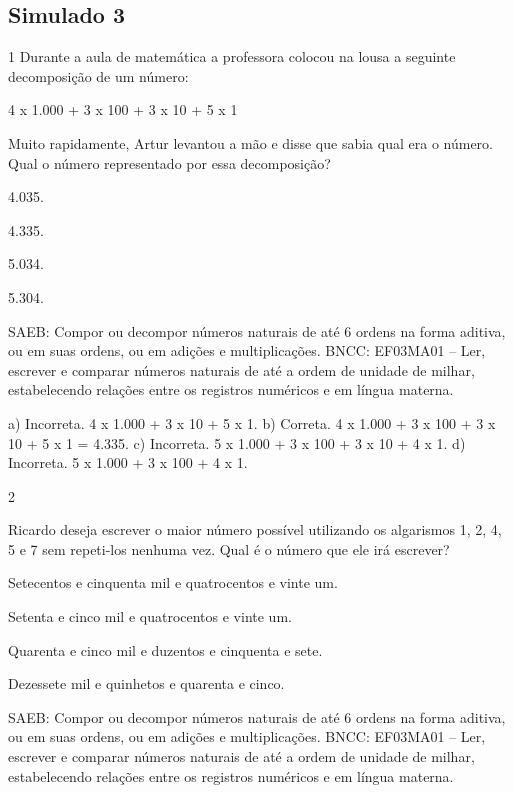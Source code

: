 {\begin{escolha}
{\chapter{Simulado 3}

\num{1} Durante a aula de matemática a professora colocou na lousa a seguinte decomposição de um número:

4 x 1.000 + 3 x 100 + 3 x 10 + 5 x 1

Muito rapidamente, Artur levantou a mão e disse que sabia qual era o número. Qual o número representado por essa decomposição?

\begin{escolha}
\item
  4.035.
\item
  4.335.
\item
  5.034.
\item
  5.304.
\end{escolha}

SAEB: Compor ou decompor números naturais de até 6 ordens na forma aditiva, ou em suas ordens, ou em adições e multiplicações.
BNCC: EF03MA01 -- Ler, escrever e comparar números naturais de até a ordem de unidade de milhar, estabelecendo relações entre os registros numéricos e em língua materna.

a) Incorreta. 4 x 1.000 + 3 x 10 + 5 x 1.
b) Correta. 4 x 1.000 + 3 x 100 + 3 x 10 + 5 x 1 = 4.335.
c) Incorreta. 5 x 1.000 + 3 x 100 + 3 x 10 + 4 x 1.
d) Incorreta. 5 x 1.000 + 3 x 100 + 4 x 1.

\num{2}

Ricardo deseja escrever o maior número possível utilizando os algarismos 1, 2, 4, 5 e 7 sem repeti-los nenhuma vez. Qual é o número que ele irá escrever?

\begin{escolha}
\item
  Setecentos e cinquenta mil e quatrocentos e vinte um.
\item
  Setenta e cinco mil e quatrocentos e vinte um.
\item
  Quarenta e cinco mil e duzentos e cinquenta e sete.
\item
  Dezessete mil e quinhetos e quarenta e cinco.
\end{escolha}

SAEB: Compor ou decompor números naturais de até 6 ordens na forma aditiva, ou em suas ordens, ou em adições e multiplicações.
BNCC: EF03MA01 -- Ler, escrever e comparar números naturais de até a ordem de unidade de milhar, estabelecendo relações entre os registros numéricos e em língua materna.

}
\end{escolha}}
